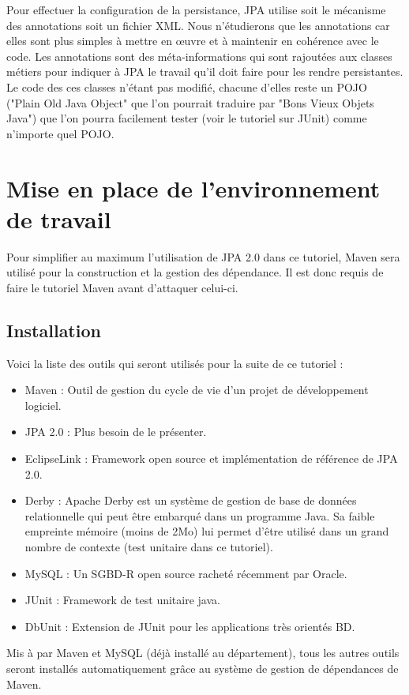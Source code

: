 \documentclass[a4paper,11pt]{article}
\begin{document}
Pour effectuer la configuration de la persistance, JPA utilise soit le mécanisme des annotations soit un fichier XML.
Nous n'étudierons que les annotations car elles sont plus simples à mettre en œuvre et à maintenir en cohérence avec le 
code. Les annotations sont des méta-informations qui sont rajoutées aux classes métiers pour indiquer à JPA le travail qu'il 
doit faire pour les rendre persistantes. Le code des ces classes n'étant pas modifié, chacune d'elles reste un POJO 
("Plain Old Java Object" que l'on pourrait traduire par "Bons Vieux Objets Java") que l'on pourra facilement tester (voir 
le tutoriel sur JUnit) comme n'importe quel POJO.

\section{Mise en place de l'environnement de travail}
Pour simplifier au maximum l'utilisation de JPA 2.0 dans ce tutoriel, Maven sera utilisé pour la construction et la 
gestion des dépendance. Il est donc requis de faire le tutoriel Maven avant d'attaquer celui-ci.

\subsection{Installation}
Voici la liste des outils qui seront utilisés pour la suite de ce tutoriel : 
\begin{itemize}
\item Maven : Outil de gestion du cycle de vie d'un projet de développement logiciel.
\item JPA 2.0 : Plus besoin de le présenter.
\item EclipseLink : Framework open source et implémentation de référence de JPA 2.0.
\item Derby : Apache Derby est un système de gestion de base de données relationnelle qui peut être embarqué dans un programme Java. 
      Sa faible empreinte mémoire (moins de 2Mo) lui permet d'être utilisé dans un grand nombre de contexte (test unitaire 
      dans ce tutoriel).
\item MySQL : Un SGBD-R open source racheté récemment par Oracle.
\item JUnit : Framework de test unitaire java.
\item DbUnit : Extension de JUnit pour les applications très orientés BD.
\end{itemize}
Mis à par Maven et MySQL (déjà installé au département), tous les autres outils seront installés automatiquement grâce au 
système de gestion de dépendances de Maven.
\end{document}
